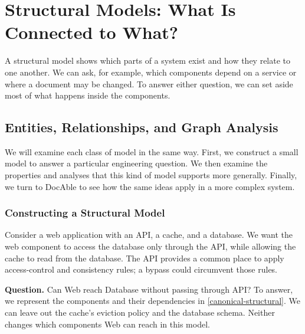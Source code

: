 


\chapter{Structural Models: What Is Connected to What?}

A structural model shows which parts of a system exist and how they relate to one another. We can ask, for example, which components depend on a service or where a document may be changed. To answer either question, we can set aside most of what happens inside the components.

\section{Entities, Relationships, and Graph Analysis}\label{heading:entities-relationships-and-graph-analysis}

We will examine each class of model in the same way. First, we construct a small model to answer a particular engineering question. We then examine the properties and analyses that this kind of model supports more generally. Finally, we turn to DocAble to see how the same ideas apply in a more complex system.

\subsection{Constructing a Structural Model}\label{heading:constructing-a-structural-model}

Consider a web application with an API, a cache, and a database. We want the web component to access the database only through the API, while allowing the cache to read from the database. The API provides a common place to apply access-control and consistency rules; a bypass could circumvent those rules.


\textbf{Question.} Can Web reach Database without passing through API? To answer, we represent the components and their dependencies in \autoref{canonical-structural}. We can leave out the cache's eviction policy and the database schema. Neither changes which components Web can reach in this model.

